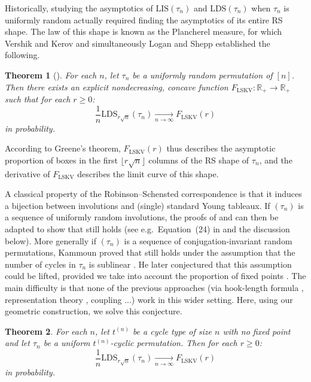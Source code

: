 \documentclass{article}
\newtheorem{theorem}{Theorem}[section]
\theoremstyle{remark}
\def\R{\mathbb{R}}
\newcommand{\cv}[2]{\underset{#1\to#2}{\longrightarrow}}
\def\LIS{\mathrm{LIS}}
\def\LDS{\mathrm{LDS}}
\def\LSKV{\mathrm{LSKV}}
\begin{document}
Historically, studying the asymptotics of $\LIS(\tau_n)$ and $\LDS(\tau_n)$ when $\tau_n$ is uniformly random actually required finding the asymptotics of its entire RS shape.
The law of this shape is known as the Plancherel measure, for which Vershik and Kerov and simultaneously Logan and Shepp established the following.
\begin{theorem}[\cite{LS77,VK77}]\label{th: LSKV uniform}
    For each $n$, let $\tau_n$ be a uniformly random permutation of $[n]$.
    Then there exists an explicit nondecreasing, concave function $F_\mathrm{LSKV} : \R_+ \to \R_+$ such that for each $r\ge0$:
    \begin{equation*}
        \frac1n \LDS_{r\sqrt n}(\tau_n) \cv{n}{\infty} F_\mathrm{LSKV}(r)
    \end{equation*}
    in probability.
\end{theorem}
According to Greene's theorem, $F_\LSKV(r)$ thus describes the asymptotic proportion of boxes in the first $\lfloor r\sqrt n\rfloor$ columns of the RS shape of $\tau_n$, and the derivative of $F_\LSKV$ describes the limit curve of this shape.

A classical property of the Robinson--Schensted correspondence is that it induces a bijection between involutions and (single) standard Young tableaux.
If $(\tau_n)$ is a sequence of uniformly random involutions, the proofs of \cite{LS77} and \cite{VK77} can then be adapted to show that  still holds (see e.g.~Equation~(24) in \cite{M11} and the discussion below).
More generally if $(\tau_n)$ is a sequence of conjugation-invariant random permutations, Kammoun proved that  still holds under the assumption that the number of cycles in $\tau_n$ is sublinear \cite[Theorem~1.8]{K18}.
He later conjectured that this assumption could be lifted, provided we take into account the proportion of fixed points \cite[Conjectures 6~and~7]{K23}.
The main difficulty is that none of the previous approaches (via hook-length formula \cite{LS77}, representation theory \cite{IO02,M11}, coupling \cite{K18}...) work in this wider setting.
Here, using our geometric construction, we solve this conjecture.

\begin{theorem}\label{th: limit shape w/o fixed points}
    For each $n$, let $t^{(n)}$ be a cycle type of size $n$ with no fixed point and let $\tau_n$ be a uniform $t^{(n)}$-cyclic permutation.
    Then for each $r\ge0$:
    \begin{equation*}
        \frac1n \LDS_{r\sqrt n}(\tau_n) \cv{n}{\infty} F_\mathrm{LSKV}(r)
    \end{equation*}
    in probability.
\end{theorem}
\end{document}
